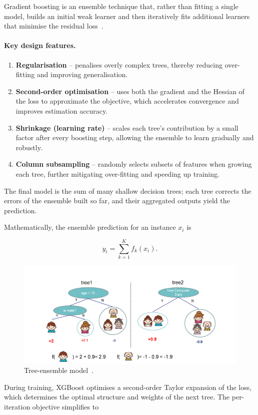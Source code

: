 \documentclass{SGGW-thesis-EN}
\begin{document}
Gradient boosting is an ensemble technique that, rather than fitting a single model,
builds an initial weak learner and then iteratively fits additional learners that
minimise the residual loss~\cite{natekin2013gradient}.

\paragraph{Key design features.}
\begin{enumerate}
  \item \textbf{Regularisation} – penalises overly complex trees, thereby reducing over-fitting and
        improving generalisation.
  \item \textbf{Second-order optimisation} – uses both the gradient and the Hessian of the loss to
        approximate the objective, which accelerates convergence and improves estimation accuracy.
  \item \textbf{Shrinkage (learning rate)} – scales each tree’s contribution by a small factor after
        every boosting step, allowing the ensemble to learn gradually and robustly.
  \item \textbf{Column subsampling} – randomly selects subsets of features when growing each tree,
        further mitigating over-fitting and speeding up training.
\end{enumerate}
The final model is the sum of many shallow decision trees; each tree corrects the errors of the
ensemble built so far, and their aggregated outputs yield the prediction.

Mathematically, the ensemble prediction for an instance \(x_i\) is

\begin{figure}[h!]
  \centering
  \begin{minipage}[c]{0.40\textwidth}
    \[
      \hat{y}_i = \sum_{k=1}^{K} f_k(x_i) .
    \]
  \end{minipage}\hfill
  \begin{minipage}[c]{0.55\textwidth}
    \centering
    \includegraphics[width=\linewidth]{images/tree_ensemble_model.png}
    \caption{Tree-ensemble model~\cite{Chen_2016}.}\label{fig:tree_ensemble_model}
  \end{minipage}
\end{figure}
\noindent During training, XGBoost optimises a second-order Taylor expansion of the loss, which
determines the optimal structure and weights of the next tree.
The per-iteration objective simplifies to
\end{document}
